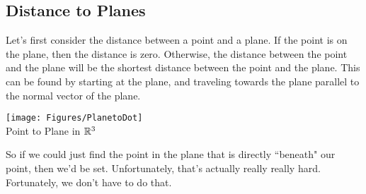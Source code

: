 \subsection{Distance to Planes}

Let's first consider the distance between a point and a plane. If the point is on the plane, then the distance is zero. Otherwise, the distance between the point and the plane will be the shortest distance between the point and the plane. This can be found by starting at the plane, and traveling towards the plane parallel to the normal vector of the plane.

\begin{center}
    \texttt{[image: Figures/PlanetoDot]}\\
    Point to Plane in $\mathbb{R}^3$
\end{center}

So if we could just find the point in the plane that is directly ``beneath" our point, then we'd be set. Unfortunately, that's actually really really hard. Fortunately, we don't have to do that.

